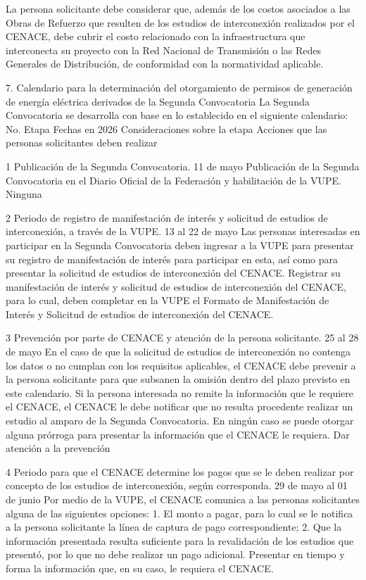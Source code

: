 La persona solicitante debe considerar que, además de los costos asociados a las Obras de Refuerzo que resulten de los estudios de interconexión realizados por el CENACE, debe cubrir el costo relacionado con la infraestructura que interconecta su proyecto con la Red Nacional de Transmisión o las Redes Generales de Distribución, de conformidad con la normatividad aplicable.\par
7. Calendario para la determinación del otorgamiento de permisos de generación de energía eléctrica derivados de la Segunda Convocatoria
La Segunda Convocatoria se desarrolla con base en lo establecido en el siguiente calendario:
No.
 Etapa
 Fechas en 2026
 Consideraciones sobre la etapa
 Acciones que las personas solicitantes deben realizar
 
 1
 Publicación de la Segunda Convocatoria.
 11 de mayo
 Publicación de la Segunda Convocatoria en el Diario Oficial de la Federación y habilitación de la VUPE.
 Ninguna
 
 2
 Periodo de registro de manifestación de interés y solicitud de estudios de interconexión, a través de la VUPE.
 13 al 22 de mayo
 Las personas interesadas en participar en la Segunda Convocatoria deben ingresar a la VUPE para presentar su registro de manifestación de interés para participar en esta, así como para presentar la solicitud de estudios de interconexión del CENACE.
 Registrar su manifestación de interés y solicitud de estudios de interconexión del CENACE, para lo cual, deben completar en la VUPE el Formato de Manifestación de Interés y Solicitud de estudios de interconexión del CENACE.
 
 3
 Prevención por parte de CENACE y atención de la persona solicitante.
 25 al 28 de mayo
 En el caso de que la solicitud de estudios de interconexión no contenga los datos o no cumplan con los requisitos aplicables, el CENACE debe prevenir a la persona solicitante para que subsanen la omisión dentro del plazo previsto en este calendario.
Si la persona interesada no remite la información que le requiere el CENACE, el CENACE le debe notificar que no resulta procedente realizar un estudio al amparo de la Segunda Convocatoria.
En ningún caso se puede otorgar alguna prórroga para presentar la información que el CENACE le requiera.
 Dar atención a la prevención
 
 4
 Periodo para que el CENACE determine los pagos que se le deben realizar por concepto de los estudios de interconexión, según corresponda.
 29 de mayo al 01 de junio
 Por medio de la VUPE, el CENACE comunica a las personas solicitantes alguna de las siguientes opciones:
1. El monto a pagar, para lo cual se le notifica a la persona solicitante la línea de captura de pago correspondiente;
2. Que la información presentada resulta suficiente para la revalidación de los estudios que presentó, por lo que no debe realizar un pago adicional.
 Presentar en tiempo y forma la información que, en su caso, le requiera el CENACE.
 
